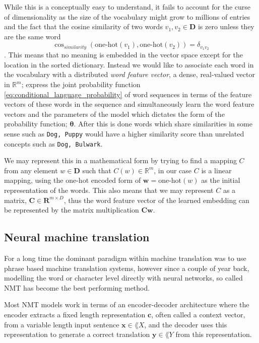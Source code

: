 While this is a conceptually easy to understand, it fails to account for the
curse of dimensionality as the size of the vocabulary might grow to millions of
entries and the fact that the cosine similarity of two words $v_1, v_2 \in
\mathbf{D}$ is zero unless they are the same word
\begin{equation}
  \label{eq:cosine_similarity}
  \cos_{similarity}(\text{one-hot}(v_1), \text{one-hot}(v_2)) = \delta_{v_1 v_2}
\end{equation}. This means that no meaning is embedded in the vector space
except for the location in the sorted dictionary. Instead we would like to
associate each word in the vocabulary with a distributed \textit{word feature
  vector}, a dense, real-valued vector in $\mathbb{R}^m$; express the joint probability
function \ref{eq:conditional_language_probability} of word sequences in terms of
the feature vectors of these words in the sequence and simultaneously learn the
word feature vectors and the parameters of the model which dictates the form of
the probability function; $\bm{\theta}$. After this is done words which share
similarities in some sense such as \texttt{Dog, Puppy} would have a higher
similarity score than unrelated concepts such as \texttt{Dog, Bulwark}\cite{Bengio:2003:NPL:944919.944966}.

We may represent this in a mathematical form by trying to find a mapping $C$
from any element $w \in \mathbf{D}$ such that $C(w) \in \mathbb{R}^m$, in our
case $C$ is a linear mapping, using the one-hot encoded form of $\bm{w} =
\text{one-hot}(w)$ as the
initial representation of the words. This also means that we may represent $C$
as a matrix, $\bm{C} \in \mathbf{R}^{m \times D}$, thus the word feature vector of
the learned embedding can be represented by the matrix multiplication
$\bm{C}\bm{w}$.

\subsection{Neural machine translation}
For a long time the dominant paradigm within machine translation was to use
phrase based machine translation systems\cite{Koehn:2003:SPT:1073445.1073462, Koehn:2007:MOS:1557769.1557821},
however since a couple of year back, modelling the word or character level
directly with neural networks, so called NMT has become the best performing
method\cite{wolk_neural-based_2015, wu_googles_2016}.

Most NMT models work in terms of an encoder-decoder architecture where the
encoder extracts a fixed length representation $\bm{c}$, often called a context
vector, from a variable length input sentence $\bm{x} \in \lang{X}$, and the
decoder uses this representation to generate a correct translation $\bm{y} \in
\lang{Y}$ from this representation\cite{cho_properties_2014}.

